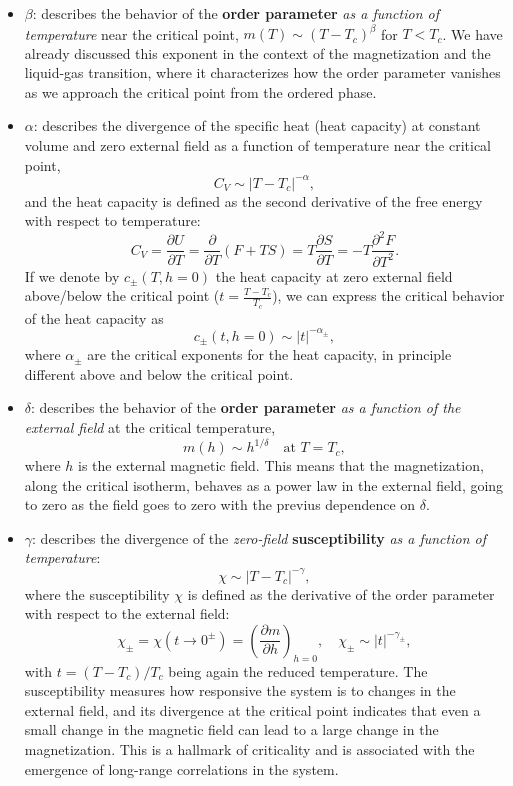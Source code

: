 \begin{itemize}
    \item $\beta$: describes the behavior of the \textbf{order parameter} \textit{as a function of temperature} near the critical point, $m(T) \sim (T - T_c)^\beta$ for $T < T_c$. We have already discussed this exponent in the context of the magnetization and the liquid-gas transition, where it characterizes how the order parameter vanishes as we approach the critical point from the ordered phase.
    \item $\alpha$: describes the divergence of the specific heat (heat capacity) at constant volume and zero external field as a function of temperature near the critical point,
          \[
              C_V \sim |T - T_c|^{-\alpha},
          \]
          and the heat capacity is defined as the second derivative of the free energy with respect to temperature:
          \[
              C_V = \frac{\partial U}{\partial T} = \frac{\partial}{\partial T} (F + TS) = T \frac{\partial S}{\partial T} = -T \frac{\partial^2 F}{\partial T^2}.
          \]
          If we denote by \(c_\pm(T,h=0)\) the heat capacity at zero external field above/below the critical point (\(t = \tfrac{T-T_c}{T_c}\)), we can express the critical behavior of the heat capacity as
          \[
              c_\pm(t, h=0) \sim |t|^{-\alpha_\pm},
          \]
          where \(\alpha_\pm\) are the critical exponents for the heat capacity, in principle different above and below the critical point.
    \item $\delta$: describes the behavior of the \textbf{order parameter} \textit{as a function of the external field} at the critical temperature,
          \[
              m(h) \sim h^{1/\delta} \quad \text{at } T = T_c,
          \]
          where $h$ is the external magnetic field. This means that the magnetization, along the critical isotherm, behaves as a power law in the external field, going to zero as the field goes to zero with the previus dependence on \(\delta\).
    \item $\gamma$: describes the divergence of the \textit{zero-field} \textbf{susceptibility} \textit{as a function of temperature}:
          \[
              \chi \sim |T - T_c|^{-\gamma},
          \]
          where the susceptibility $\chi$ is defined as the derivative of the order parameter with respect to the external field:
          \[
              \chi_\pm = \chi(t \to 0^{\pm}) = \left(\frac{\partial m}{\partial h}\right)_{h=0}, \quad \chi_\pm \sim |t|^{-\gamma_{\pm}},
          \]
          with $t = (T - T_c)/T_c$ being again the reduced temperature. The susceptibility measures how responsive the system is to changes in the external field, and its divergence at the critical point indicates that even a small change in the magnetic field can lead to a large change in the magnetization. This is a hallmark of criticality and is associated with the emergence of long-range correlations in the system.

\end{itemize}

